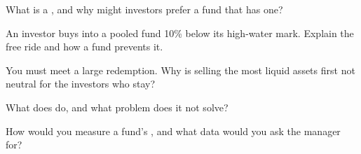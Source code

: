 \begin{interviewq}\label{iq:fm:the-asset-manager-and-the-fund:2}
What is a , and why might investors prefer a fund that has one?
\end{interviewq}

\begin{interviewq}\label{iq:fm:the-asset-manager-and-the-fund:3}
An investor buys into a pooled fund 10\% below its high-water mark. Explain the free ride and how a fund prevents it.
\end{interviewq}

\begin{interviewq}\label{iq:fm:the-asset-manager-and-the-fund:4}
You must meet a large redemption. Why is selling the most liquid assets first not neutral for the investors who stay?
\end{interviewq}

\begin{interviewq}\label{iq:fm:the-asset-manager-and-the-fund:5}
What does  do, and what problem does it not solve?
\end{interviewq}

\begin{interviewq}\label{iq:fm:the-asset-manager-and-the-fund:6}
How would you measure a fund's , and what data would you ask the manager for?
\end{interviewq}
